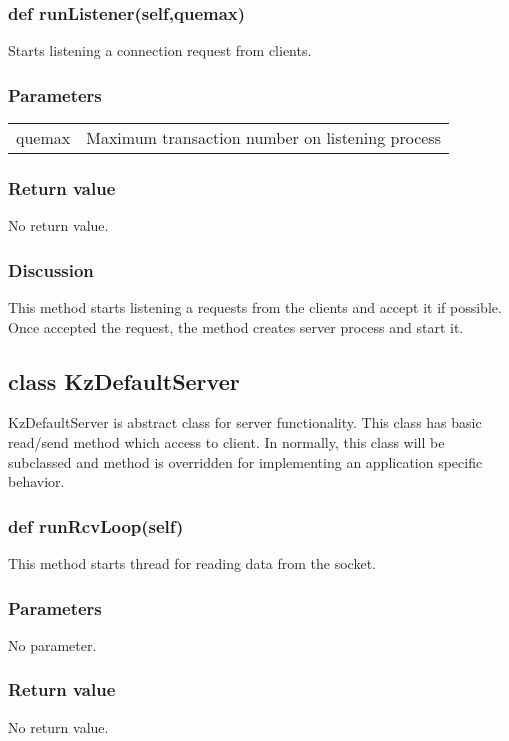 \documentclass[a4paper,10pt]{jsarticle}
\begin{document}

\subsubsection{def runListener(self,quemax)}
Starts listening a connection request from clients.

\subsubsection*{Parameters}
\begin{tabular}{ll}
quemax	&Maximum transaction number on listening process
\end{tabular}

\subsubsection*{Return value}
No return value.

\subsubsection*{Discussion}
This method starts listening a requests from the clients and accept it if possible.
Once accepted the request, the method creates server process and start it.


\subsection{class KzDefaultServer}
KzDefaultServer is abstract class for server functionality.
This class has basic read/send method which access to client.
In normally, this class will be subclassed and method is overridden for implementing an application specific behavior.

\subsubsection{def runRcvLoop(self)}
This method starts thread for reading data from the socket.

\subsubsection*{Parameters}
No parameter.

\subsubsection*{Return value}
No return value.
\end{document}
